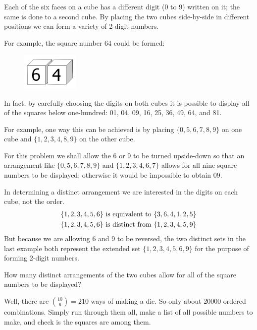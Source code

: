 


Each of the six faces on a cube has a different digit (0 to 9) written on it; the same is done to a second cube. By placing the two cubes side-by-side in different positions we can form a variety of 2-digit numbers.

For example, the square number 64 could be formed:
\vspace{-0.5cm}
\begin{center}
\begin{figure}[h]
\centering
\includegraphics[width = 0.25\textwidth]{./images/p_090.png}
\end{figure}
\end{center}
\vspace{-1.2cm}
In fact, by carefully choosing the digits on both cubes it is possible to display all of the squares below one-hundred: 01, 04, 09, 16, 25, 36, 49, 64, and 81.

For example, one way this can be achieved is by placing $\{0, 5, 6, 7, 8, 9\}$ on one cube and $\{1, 2, 3, 4, 8, 9\}$ on the other cube.

For this problem we shall allow the 6 or 9 to be turned upside-down so that an arrangement like $\{0, 5, 6, 7, 8, 9\}$ and $\{1, 2, 3, 4, 6, 7\}$ allows for all nine square numbers to be displayed; otherwise it would be impossible to obtain 09.

In determining a distinct arrangement we are interested in the digits on each cube, not the order.
\begin{eqnarray*}
\{1, 2, 3, 4, 5, 6\} \hbox{ is equivalent to } \{3, 6, 4, 1, 2, 5\} \\
\{1, 2, 3, 4, 5, 6\} \hbox{ is distinct from } \{1, 2, 3, 4, 5, 9\}
\end{eqnarray*}
But because we are allowing 6 and 9 to be reversed, the two distinct sets in the last example both represent the extended set $\{1, 2, 3, 4, 5, 6, 9\}$ for the purpose of forming 2-digit numbers.

How many distinct arrangements of the two cubes allow for all of the square numbers to be displayed?

Well, there are $\binom {10}6 = 210$ ways of making a die.  So only about 20000 ordered combinations.  Simply run through them all, make a list of all possible numbers to make, and check is the squares are among them.


